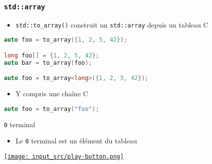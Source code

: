 \documentclass[C++.tex]{subfiles}
\begin{document}
\begin{frame}[fragile]
	\frametitle{\lstinline|std::array|}
	\begin{itemize}
		\item \lstinline|std::to_array()| construit un \lstinline|std::array| depuis un tableau C
	\end{itemize}

	\begin{lstlisting}[language=C++]
auto foo = to_array({1, 2, 5, 42});

long foo[] = {1, 2, 5, 42};
auto bar = to_array(foo);

auto foo = to_array<long>({1, 2, 5, 42});\end{lstlisting}

	\begin{itemize}
		\item Y compris une chaîne C
	\end{itemize}

	\begin{lstlisting}[language=C++]
auto foo = to_array("foo");\end{lstlisting}

	\begin{alertblock}{\lstinline|0| terminal}
		\begin{itemize}
			\item Le \lstinline|0| terminal est un élément du tableau
		\end{itemize}
	\end{alertblock}

	\hfill
	\href{https://godbolt.org/#z:OYLghAFBqd5QCxAYwPYBMCmBRdBLAF1QCcAaPECAMzwBtMA7AQwFtMQByARg9KtQYEAysib0QXACx8BBAKoBnTAAUAHpwAMvAFYTStJg1DIApACYAQuYukl9ZATwDKjdAGFUtAK4sGe1wAyeAyYAHI%2BAEaYxCAAzADspAAOqAqETgwe3r56KWmOAkEh4SxRMQm2mPYFDEIETMQEWT5%2BXJXVGXUNBEVhkdF6CvWNzTltQ929JWUSAJS2qF7EyOwc5rHByN5YANQmsW4NxEwAnvvYJhoAguub25h7B05DxJis55c318EEOyxMwQgs0%2BJniVmuOz2YM%2BkMhTC8RB2/FQjwAIjshugQCAiAB9I6nCDmMzI4nA2Lgq6wjEELEoRa/fZuJlI1CoAB0aQAXpggY9mQc9mYzCYAKxuBjE/aU6n8YgQNAMIY7eGI5A7ECs1DAiGw0Ey6k0uloBH8lnqpks4lCkUUmF6%2BKo%2B2QzHYk2Mg5W4ViiVSu260FO672/XOlUIlHItFG7F4gknIlgto7MykHaitOSVPpgAcgfJBpdtLdDLNguRnLwPL5lsFUvFku9/qpsLlCoEytVKPVmuROpbkNDuuprvpptrbh2Fs9deFNulYcDYdH7rLk/rvqbBqXwYD0OHO1oAmAWrFVlF6P2l6TaezGZ2WbTsViaa4IsdC4PXZ2EQa0dHcbEMcCZ9p%2BA4xmOHoCpOv7EJW1azGu84Nn6hasvKiqdhGU4aj%2BDT9tSQ7gUWxqlhOOHkdaqGLh%2BB4rmRM7rt6KFbiGtE3OxHDzLQnCirwfgcFopCoJwzKWNYGKLMsDzrDwpAEJoXHzAA1iAooaPonCSPxinCZwvAKCAGkKYJXGkHAsBIJgqiYMgEZkBQEANMACjKIYVRCAgqAAO4CXJaAsEkdBMDUbkhLQnk%2BQJQkBUF9AxMAb6prFdDRKErCrLwKXxQA8gikW%2Bbp1m2VcxAufppDFcgdT4AJvD8IIIhiOwUgyIIigqOopmkLobQGEYKDWNY%2Bh4BEhmwMwbAgBEbJDKQABuAzcPEfGzPMqBJDUhkcAAtJiV6mOJlhmBoOw7QA6mItBned1kEMcZ1JJg6CGI4yAGVJKyDLSwRhR5XmFdwvD3Zgqxyd5xxJIp3G8Tp3UiRw2A2XZRDEDsqg5gAbDtmOSDswDIOqb7smYOwQGJViWGmuCECQQqxFwszA9D8wIG8WAxECpCqepmkcNppDRbwCMGUZ8ks3zZhw0JIvi6Za0LdEaTOJIQA%3D%3D}{\texttt{[image: input\_src/play-button.png]}}
\end{frame}
\end{document}
